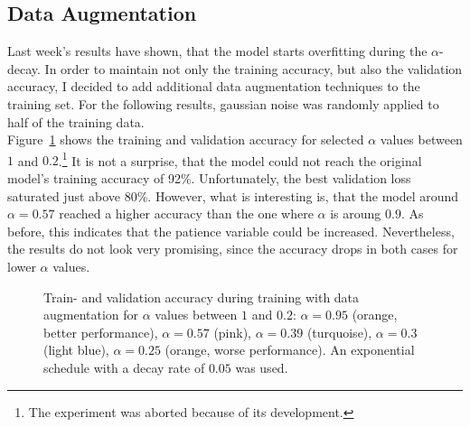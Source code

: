 \documentclass[10pt,twocolumn,letterpaper]{article}
\begin{document}
\subsection{Data Augmentation}
Last week's results have shown, that the model starts overfitting during the $\alpha$-decay.
In order to maintain not only the training accuracy, but also the validation accuracy, I decided to add additional data augmentation techniques to the training set.
For the following results, gaussian noise was randomly applied to half of the training data.\\
Figure~\ref{fig:acc_DA} shows the training and validation accuracy for selected $\alpha$ values between $1$ and $0.2$.\footnote{The experiment was aborted because of its development.}
It is not a surprise, that the model could not reach the original model's training accuracy of 92\%.
Unfortunately, the best validation loss saturated just above 80\%.
However, what is interesting is, that the model around $\alpha=0.57$ reached a higher accuracy than the one where $\alpha$ is aroung $0.9$.
As before, this indicates that the patience variable could be increased.
Nevertheless, the results do not look very promising, since the accuracy drops in both cases for lower $\alpha$ values.
\begin{figure}[hpbt]
	\centering
	\hspace{0.1\textwidth}
	\caption[]{Train- and validation accuracy during training with data augmentation for $\alpha$ values between $1$ and $0.2$: $\alpha=0.95$ (orange, better performance), $\alpha=0.57$ (pink), $\alpha=0.39$ (turquoise), $\alpha=0.3$ (light blue), $\alpha=0.25$ (orange, worse performance).
	An exponential schedule with a decay rate of $0.05$ was used.}
	\label{fig:acc_DA}
\end{figure}
\end{document}
